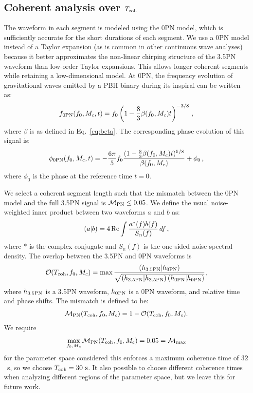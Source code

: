 \documentclass[aps,prd,amsmath,floats,floatfix, twocolumn,
superscriptaddress,nofootinbib,showpacs]{revtex4-2}
\begin{document}
\subsection{Coherent analysis over $T_{\rm coh}$}
\label{sec:coherent_analysis}
The waveform in each segment is modeled using the 0PN model, which is sufficiently accurate for the short durations of each segment. We use a 0PN model instead of a Taylor expansion (as is common in other continuous wave analyses) because it better approximates the non-linear chirping structure of the 3.5PN waveform than low-order Taylor expansions. This allows longer coherent segments while retaining a low-dimensional model. At 0PN, the frequency evolution of gravitational waves emitted by a PBH binary during its inspiral can be written as:
\begin{equation}
    f_{\rm 0PN}(f_0, M_c, t) = f_0 \left( 1-\frac{8}{3}\beta(f_0, M_c) t \right)^{-3/8} \, , \label{eq:f}
\end{equation}
where $\beta$ is as defined in Eq.~\ref{eq:beta}. The corresponding phase evolution of this signal is:
\begin{equation}
    \phi_{\rm 0PN}(f_0, M_c, t) = -\frac{6\pi}{5} f_0 \frac{(1-\frac{8}{3}\beta(f_0, M_c) t)^{5/8}}{\beta(f_0, M_c)} + \phi_0 \, , \label{eq:phi}
\end{equation}
where $\phi_0$ is the phase at the reference time $t=0$. 

We select a coherent segment length such that the mismatch between the 0PN model and the full 3.5PN signal is $\mathcal{M}_{\rm PN} \leq 0.05$. We define the usual noise-weighted inner product between two waveforms $a$ and $b$ as:
\begin{equation}
(a|b)
=
4 \, {\rm Re}
\int
\frac{a^{*}(f)b(f)}{S_n(f)}\,df \, ,
\end{equation}
where $*$ is the complex conjugate and $S_n(f)$ is the one-sided noise spectral density. 
The overlap between the 3.5PN and 0PN waveforms is
\begin{equation}
\mathcal{O}(T_{\rm coh}, f_0, M_c)
=
\max
\frac{
\left(h_{\rm 3.5PN} \middle| h_{\rm 0PN}\right)
}{
\sqrt{
\left(h_{\rm 3.5PN} \middle| h_{\rm 3.5PN}\right)
\left(h_{\rm 0PN} \middle| h_{\rm 0PN}\right)
}
} ,
\end{equation}
where $h_{\rm 3.5PN}$ is a 3.5PN waveform, $h_{\rm 0PN}$ is a 0PN waveform, and relative time and phase shifts. The mismatch is defined to be:
\begin{equation}
\mathcal{M}_{\rm PN}(T_{\rm coh}, f_0, M_c)
=
1 - \mathcal{O}(T_{\rm coh}, f_0, M_c).
\end{equation}
We require
\begin{equation}
\max_{f_0,M_c}
\mathcal{M}_{\rm PN}(T_{\rm coh}, f_0, M_c)
= 0.05 = \mathcal{M}_{\rm max}
\label{eq:coherent_mismatch_max}
\end{equation}
for the parameter space considered this enforces a maximum coherence time of $32$~s, so we choose $T_{\rm coh}=30~{\rm s}$. It also possible to choose different coherence times when analyzing different regions of the parameter space, but we leave this for future work. 
\end{document}
